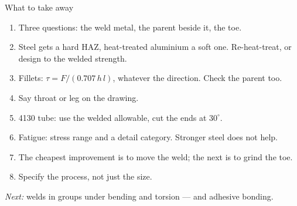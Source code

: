 \documentclass[aspectratio=169,10pt]{beamer}
\begin{document}
\begin{frame}{What to take away}
\begin{enumerate}
  \item Three questions: the weld metal, the parent beside it, the toe.
  \item Steel gets a hard HAZ, heat-treated aluminium a soft one. Re-heat-treat, or design to the welded strength.
  \item Fillets: $\tau=F/(0.707\,h\,l)$, whatever the direction. Check the parent too.
  \item Say throat or leg on the drawing.
  \item 4130 tube: use the welded allowable, cut the ends at $30^\circ$.
  \item Fatigue: stress range and a detail category. Stronger steel does not help.
  \item The cheapest improvement is to move the weld; the next is to grind the toe.
  \item Specify the process, not just the size.
\end{enumerate}
\vfill
\emph{Next:} welds in groups under bending and torsion --- and adhesive bonding.
\end{frame}
\end{document}
